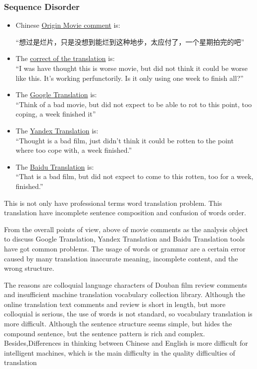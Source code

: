 \documentclass[conference]{IEEEtran}
\begin{document}
\begin{CJK*}{UTF8}{gbsn}
\subsubsection{Sequence Disorder}
\begin{itemize}
\item Chinese \underline{Origin Movie comment} is:
  \begin{center}
    ``想过是烂片，只是没想到能烂到这种地步，太应付了，一个星期拍完的吧''
  \end{center}
\item The \underline{correct of the translation} is:\\
  ``I was have thought this is worse movie, but did not think it could be worse
  like this. It's working perfunctorily. Is it only using one week to finish all?''
\item The \underline{Google Translation} is:\\
  ``Think of a bad movie, but did not expect to be able to rot to this point,
  too coping, a week finished it''
\item The \underline{Yandex Translation} is:\\
  ``Thought is a bad film, just didn't think it could be rotten to the point where
too cope with, a week finished.''
\item The \underline{Baidu Translation} is:\\
  ``That is a bad film, but did not expect to come to this rotten, too for a week, finished.''
\end{itemize}
This is not only have professional terms word translation problem. This
translation have incomplete sentence composition and confusion of words order.

From the overall points of view, above of movie comments as the analysis
object to discuss Google Translation, Yandex Translation and Baidu Translation
tools have got common problems. The usage of words or grammar are a certain
error caused by many translation inaccurate meaning, incomplete content, and
the wrong structure.

The reasons are colloquial language characters of Douban film review comments and
insufficient machine translation vocabulary collection library. Although the
online translation text comments and review is short in length, but
more colloquial is serious, the use of words is not standard, so vocabulary
translation is more difficult. Although the sentence structure seems simple, but
hides the compound sentence, but the sentence pattern is rich and
complex. Besides,Differences in thinking between Chinese and English is more
difficult for intelligent machines, which is the main difficulty in the quality
difficulties of translation


\end{CJK*}
\end{document}
